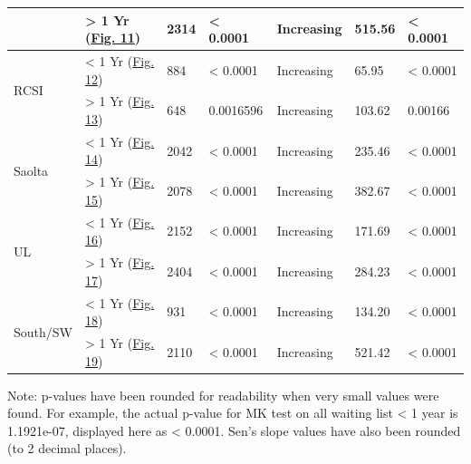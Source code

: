 \documentclass[
  12pt,
]{article}
\begin{document}
\begin{table}[!htbp]
\begin{threeparttable}
\begin{tabular}{ll|lll|ll}
                                      & > 1 Yr (\hyperref[fig:ts-ie-gt1yr]{Fig. 11})
                                      & 2314 & < 0.0001 & Increasing & 515.56 & < 0.0001 \\ \hline
                           
        \multirow{2}{*}{RCSI} & < 1 Yr (\hyperref[fig:ts-rcsi-lt1yr]{Fig. 12}) 
                                  & 884 & < 0.0001 & Increasing & 65.95 & < 0.0001 \\
                                  
                                      & > 1 Yr (\hyperref[fig:ts-rcsi-gt1yr]{Fig. 13})
                                      & 648 & 0.0016596 & Increasing & 103.62 & 0.00166 \\ \hline
                                      
        \multirow{2}{*}{Saolta} & < 1 Yr (\hyperref[fig:ts-saolta-lt1yr]{Fig. 14}) 
                                  & 2042 & < 0.0001 & Increasing & 235.46 & < 0.0001 \\
                                  
                                      & > 1 Yr (\hyperref[fig:ts-saolta-gt1yr]{Fig. 15})
                                      & 2078 & < 0.0001 & Increasing & 382.67 & < 0.0001 \\ \hline
                                      
        \multirow{2}{*}{UL} & < 1 Yr (\hyperref[fig:ts-ul-lt1yr]{Fig. 16}) 
                                  & 2152 & < 0.0001 & Increasing & 171.69 & < 0.0001 \\
                                  
                                      & > 1 Yr (\hyperref[fig:ts-ul-gt1yr]{Fig. 17})
                                      & 2404 & < 0.0001 & Increasing & 284.23 & < 0.0001 \\ \hline
                                     
        \multirow{2}{*}{South/SW} & < 1 Yr (\hyperref[fig:ts-ssw-lt1yr]{Fig. 18}) 
                                  & 931 & < 0.0001 & Increasing & 134.20 & < 0.0001 \\
                                  
                                      & > 1 Yr (\hyperref[fig:ts-ssw-gt1yr]{Fig. 19})
                                      & 2110 & < 0.0001 & Increasing & 521.42 & < 0.0001 \\ \hline
        \bottomrule
    \end{tabular}
    \begin{tablenotes}
      \small
      \item Note: p-values have been rounded for readability when very small values were found. For example, the actual p-value for MK test on all waiting list < 1 year is 1.1921e-07, displayed here as < 0.0001. Sen's slope values have also been rounded (to 2 decimal places). 
    \end{tablenotes}
    \end{threeparttable}
\end{table}
\end{document}
